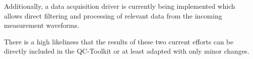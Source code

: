 \documentclass[a4paper,12pt]{article}
\begin{document}
Additionally, a data acquisition driver is currently being implemented which allows direct filtering and processing of relevant data from the incoming measurement waveforms.

There is a high likeliness that the results of these two current efforts can be directly included in the QC-Toolkit or at least adapted with only minor changes.

\end{document}
